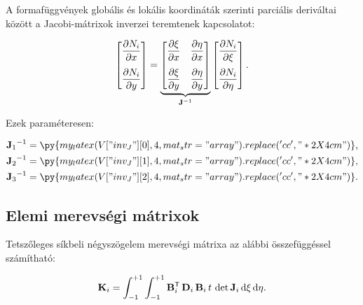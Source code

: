 A formafüggvények globális és lokális koordináták szerinti parciális deriváltai
között a Jacobi-mát\-rix\-ok inverzei teremtenek kapcsolatot:
\begin{myframe}
  \begin{equation}
    \begin{bmatrix}
      \displaystyle \pdv{N_i}{x} \\[4mm]
      \displaystyle \pdv{N_i}{y} \\
    \end{bmatrix}
    =
    \underbrace{
      \begin{bmatrix}
        \displaystyle \pdv{\xi}{x} &
        \displaystyle \pdv{\eta}{x}  \\[4mm]
        \displaystyle \pdv{\xi}{y} &
        \displaystyle \pdv{\eta}{y}  \\
      \end{bmatrix}
    }_{\mathbf{J}^{-1}}
    \begin{bmatrix}
      \displaystyle \pdv{N_i}{\xi}  \\[4mm]
      \displaystyle \pdv{N_i}{\eta} \\
    \end{bmatrix}
    \text.
  \end{equation}
\end{myframe}
Ezek paraméteresen:
\begin{myframe}
  \def\arraystretch{2.15}
  \begin{align}
    {\rmat J_1}^{-1} & =
    \py{my_latex(V["inv_J"][0], 4, mat_str="array").replace('cc', "*{2}{X{4cm}}")}
    \text,
    \\
    {\rmat J_2}^{-1} & =
    \py{my_latex(V["inv_J"][1], 4, mat_str="array").replace('cc', "*{2}{X{4cm}}")}
    \text,
    \\
    {\rmat J_3}^{-1} & =
    \py{my_latex(V["inv_J"][2], 4, mat_str="array").replace('cc', "*{2}{X{4cm}}")}
    \text.
  \end{align}
\end{myframe}

\subsection{Elemi merevségi mátrixok}

Tetszőleges síkbeli négyszögelem merevségi mátrixa az alábbi összefüggéssel
számítható:
\begin{myframe}
  \begin{equation}
    \mathbf{K}_i
    = \int_{-1}^{+1} \int_{-1}^{+1}
    \mathbf{B}^{\mathsf T}_i \,
    \mathbf{D}_i \,
    \mathbf{B}_i \,
    t \,
    \det \mathbf{J}_i \,
    \mathrm d \xi \,
    \mathrm d \eta
    \text.
  \end{equation}
\end{myframe}

